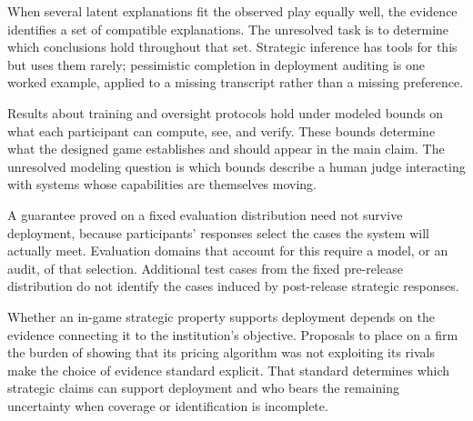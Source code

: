  When several latent explanations fit
the observed play equally well, the evidence identifies a set of compatible
explanations. The unresolved task is to determine which conclusions hold throughout
that set. Strategic inference has tools for this but uses them rarely; pessimistic
completion in deployment auditing is one worked example, applied to a missing
transcript rather than a missing preference.

 Results about training and oversight
protocols hold under modeled bounds on what each participant can compute, see,
and verify. These bounds determine what the designed game establishes and should
appear in the main claim. The unresolved modeling question is which bounds describe
a human judge interacting with systems whose capabilities are themselves moving.

 A guarantee proved on a fixed
evaluation distribution need not survive deployment, because participants'
responses select the cases the system will actually meet. Evaluation domains that
account for this require a model, or an audit, of that selection. Additional test
cases from the fixed pre-release distribution do not identify the cases induced by
post-release strategic responses.

Whether an in-game strategic property supports deployment depends on the evidence
connecting it to the institution's objective. Proposals to place on a firm the
burden of showing that its pricing algorithm was not exploiting its rivals make the
choice of evidence standard explicit. That standard determines which strategic
claims can support deployment and who bears the remaining uncertainty when coverage
or identification is incomplete.
